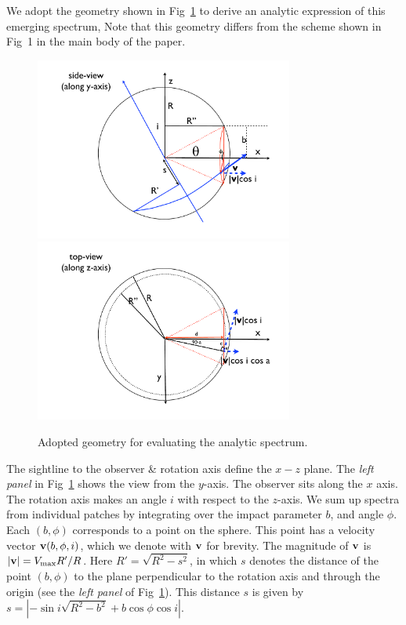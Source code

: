 \documentclass{emulateapj}
\begin{document}
We adopt the geometry shown in Fig~\ref{fig:scheme} to derive an analytic expression of this emerging spectrum,
Note that this geometry differs from the scheme shown in Fig~1 in the main body of
the paper. 
%
\begin{figure}[h]
\centerline{\includegraphics[width=85mm]{fig11a.pdf}
\includegraphics[width=85mm]{fig11b.pdf}}
\caption[]{Adopted geometry for evaluating the analytic spectrum.}
\label{fig:scheme}
\end{figure} 
%
The sightline to the observer \& rotation axis define the $x-z$ plane. 
The {\it left panel} in Fig~\ref{fig:scheme} shows the view from the $y$-axis. 
The observer sits along the $x$ axis. 
The rotation axis makes an angle $i$ with respect to the $z$-axis. 
We sum up spectra from individual patches by integrating over the
impact parameter $b$, and angle $\phi$. 
Each $(b,\phi)$ corresponds to a point on the sphere. 
This point has a velocity vector ${\bf v}(b,\phi,i)$, which we denote
with ${\bf v}$ for brevity. The magnitude of ${\bf v}$ is $|{\bf v}|=V_{\rm max}R'/R$. Here $R'=\sqrt{R^2 -s^2}$, in which $s$ denotes the distance of the point $(b,\phi)$ to the plane perpendicular to the rotation axis and through the origin (see the {\it left panel} of Fig~\ref{fig:scheme}). This distance $s$ is given by $s=|-\sin i\sqrt{R^2-b^2}+ b \cos \phi \cos i|$.\\
\end{document}
